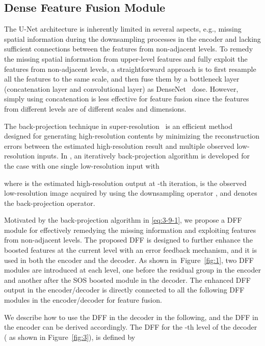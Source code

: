 \documentclass[10pt,twocolumn,letterpaper]{article}
\newcommand{\figref}[1]{Figure~\ref{fig:#1}}
\begin{document}
\subsection{Dense Feature Fusion Module}
  \label{sec:3.2}
  \vspace{-1mm}
  The U-Net architecture is inherently limited in several aspects, e.g., missing spatial information during the downsampling processes in the encoder and
  lacking sufficient connections between the features from non-adjacent levels.
To remedy the missing spatial information from upper-level features and fully exploit the features from non-adjacent levels,
  a straightforward approach is to first resample all the features to the same scale,
  and then fuse them by a bottleneck layer (concatenation layer and convolutional layer) as DenseNet~\cite{desnenet} dose.
However, simply using concatenation is less effective for feature fusion since the features from different levels are of different scales and dimensions.
  
  The back-projection technique in super-resolution~\cite{Irani1991} is an efficient method designed for generating high-resolution contents
  by minimizing the reconstruction errors between the estimated high-resolution result  and multiple observed low-resolution inputs.
In \cite{BiBP}, an iteratively back-projection algorithm is developed for the case with one single low-resolution input with
  
  where  is the estimated high-resolution output at -th iteration,
   is the observed low-resolution image acquired by using the downsampling operator ,
  and  denotes the back-projection operator.


Motivated by the back-projection algorithm in \eqref{eq:3-9-1},
  we propose a DFF module for effectively remedying the missing information and exploiting features from non-adjacent levels.
The proposed DFF is designed to further enhance the boosted features at the current level
  with an error feedback mechanism, and it is used in both the encoder and the decoder.
As shown in~\figref{1}, two DFF modules are introduced at each level, one before the residual group in the encoder and another after the SOS boosted module in the decoder.
The enhanced DFF output in the encoder/decoder is directly connected to all the following DFF modules in the encoder/decoder for feature fusion.
  
  We describe how to use the DFF in the decoder in the following, and the DFF in the encoder can be derived accordingly.
The DFF for the -th level of the decoder ( as shown in \figref{3}),
  is defined by
\end{document}
